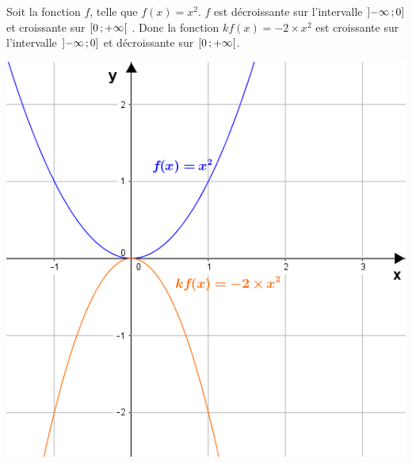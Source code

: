 \documentclass[12pt,a4paper]{article}
\begin{document}
\begin{myex}	
	
	\begin{multicols}{2}
		\vspace*{15mm}
		
		Soit la fonction $f$, telle que $f(x) = x^2$.
		$f$ est décroissante sur l'intervalle $\mbox{\ensuremath{\left]-\infty\mathpunct{};0\right]}} $ et croissante sur $\mbox{\ensuremath{\left[0\mathpunct{};+\infty\right[}}$ .
		Donc la fonction $kf(x) = -2 \times x^2$ est croissante sur l'intervalle $\mbox{\ensuremath{\left]-\infty\mathpunct{};0\right]}} $ et décroissante sur $\mbox{\ensuremath{\left[0\mathpunct{};+\infty\right[}}$.
		
		\includegraphics[scale=0.65]{./img/kf2}
	\end{multicols}
\end{myex}
\end{document}
